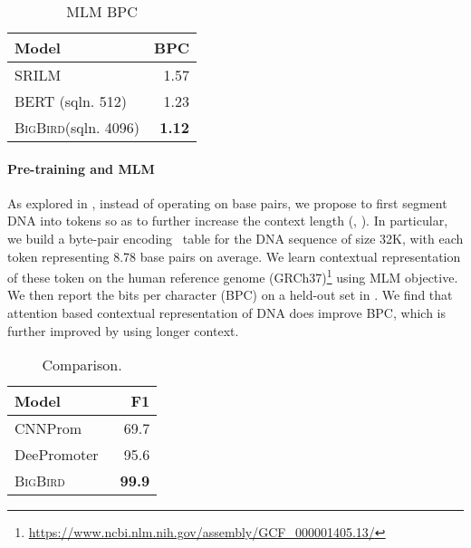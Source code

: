\documentclass{article}
\newcommand{\bigb}{\textsc{BigBird}\xspace}
\begin{document}
\begin{wraptable}{r}{39mm}
    \vspace{-4mm}
    \centering
    \small
    \begin{tabular}{@{}lr@{}}
    \toprule
    Model &  BPC \\
    \midrule
    SRILM \cite{liang2012segmenting}  & 1.57  \\
    BERT (sqln. 512)  & 1.23 \\
    \midrule
\bigb (sqln. 4096)   & \textbf{1.12} \\
     \bottomrule
    \end{tabular}
    \caption{MLM BPC}
    \label{tab:gml}
    \vspace{-3mm}
\end{wraptable}
\paragraph{Pre-training and MLM}
As explored in \citet{liang2012segmenting}, instead of operating on base pairs, we propose to first segment DNA into tokens so as to further increase the context length (, ).
In particular, we build a byte-pair encoding~\citep{kudo2018sentencepiece} table for the DNA sequence of size 32K, with each token representing 8.78 base pairs on average.
We learn contextual representation of these token on the human reference genome (GRCh37)\footnote{\url{https://www.ncbi.nlm.nih.gov/assembly/GCF_000001405.13/}} using MLM objective.
We then report the bits per character (BPC) 
on a held-out set in . 
We find that attention based contextual representation of DNA does improve BPC, which is further improved by using longer context.

 \begin{wraptable}{r}{35mm}
    \vspace{-4mm}
    \centering
    \small
    \begin{tabular}{@{}lr@{}}
    \toprule
    Model &  F1 \\
    \midrule
    CNNProm~\citep{umarov2017recognition}  & 69.7  \\
    DeePromoter~\citep{oubounyt2019deepromoter}  & 95.6 \\
    \midrule
\bigb   & \textbf{99.9} \\
     \bottomrule
    \end{tabular}
    \caption{Comparison.}
    \label{tab:gpp}
    \vspace{-3mm}
\end{wraptable}
\end{document}
